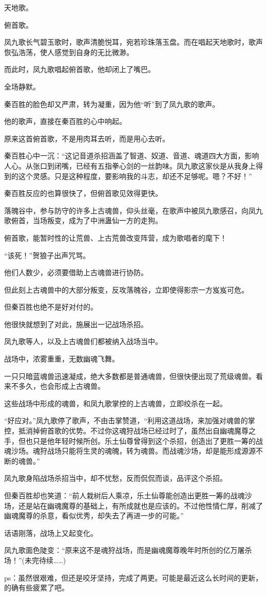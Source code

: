 \begin{this_body}
天地歌。

俯首歌。

凤九歌长气碧玉歌时，歌声清脆悦耳，宛若珍珠落玉盘。而在唱起天地歌时，歌声恢弘浩荡，使人感觉到自身的无比微渺。

而此时，凤九歌唱起俯首歌，他却闭上了嘴巴。

全场静默。

秦百胜的脸色却又严肃，转为凝重，因为他“听”到了凤九歌的歌声。

他的歌声，直接在秦百胜的心中响起。

原来这首俯首歌，不是用肉耳去听，而是用心去听。

秦百胜心中一沉：“这记音道杀招涵盖了智道、奴道、音道、魂道四大方面，影响人心。从张口到闭嘴，已经有五指拳心剑的一丝韵味。凤九歌这家伙是从我身上得到的这个灵感。只是这种程度，要影响我的斗志，却还不足够呢。嗯？不好！”

秦百胜反应的也算很快了，但俯首歌见效得更快。

落魄谷中，参与防守的许多上古魂兽，仰头丝毫，在歌声中被凤九歌感召，向凤九歌俯首，当场叛变，成为了中洲蛊仙一方的走狗。

俯首歌，能暂时性的让荒兽、上古荒兽改变阵营，成为歌唱者的麾下！

“该死！”贺狼子出声咒骂。

他们人数少，必须要借助上古魂兽进行协防。

但此刻上古魂兽中的大部分叛变，反攻落魄谷，立即使得影宗一方岌岌可危。

但秦百胜也绝不是好对付的。

他很快就想到了对此，施展出一记战场杀招。

凤九歌等人，以及上古魂兽们都被纳入战场当中。

战场中，浓雾重重，无数幽魂飞舞。

一只只暗蓝魂兽迅速凝成，绝大多数都是普通魂兽，但很快便出现了荒级魂兽。看来不多久，也会形成上古魂兽。

这些战场中形成的魂兽，和凤九歌掌控的上古魂兽，立即绞杀在一起。

“好应对。”凤九歌停了歌声，不由击掌赞道，“利用这道战场，来加强对魂兽的掌控，抵消掉俯首歌的优势。不过你这魂狩战场已经过时了，虽然出自幽魂魔尊之手，但也只是他年轻时候所创。乐土仙尊曾得到这个杀招，创造出了更胜一筹的战魂沙场。魂狩战场只能将生灵的魂魄，转为魂兽。而战魂沙场，却是能形成源源不断的魂兽。”

凤九歌身陷战场杀招当中，却不忧愁，反而侃侃而谈，品评这个杀招。

但秦百胜却也笑道：“前人栽树后人乘凉，乐土仙尊能创造出更胜一筹的战魂沙场，还是站在幽魂魔尊的基础上，有所成就也是应该的。不过他性情仁厚，削减了幽魂魔尊的杀意，看似优秀，却失去了再进一步的可能。”

话语刚落，战场上又起变化。

凤九歌面色陡变：“原来这不是魂狩战场，而是幽魂魔尊晚年时所创的亿万屠杀场！”(未完待续……)

ps：虽然很艰难，但还是咬牙坚持，完成了两更。可能是最近这么长时间的更新，的确有些疲累了吧。

\end{this_body}

